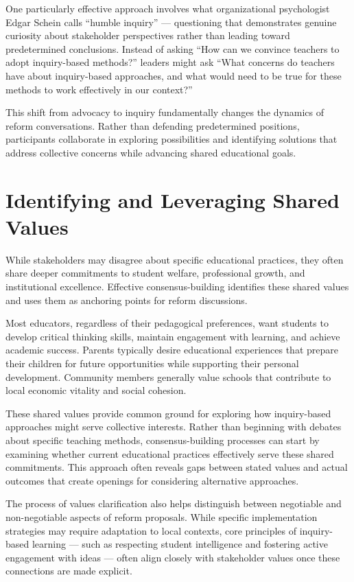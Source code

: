 \documentclass[
  Letterpaper,
]{scrbook}
\begin{document}
One particularly effective approach involves what organizational
psychologist Edgar Schein calls ``humble inquiry'' --- questioning that
demonstrates genuine curiosity about stakeholder perspectives rather
than leading toward predetermined conclusions. Instead of asking ``How
can we convince teachers to adopt inquiry-based methods?'' leaders might
ask ``What concerns do teachers have about inquiry-based approaches, and
what would need to be true for these methods to work effectively in our
context?''

This shift from advocacy to inquiry fundamentally changes the dynamics
of reform conversations. Rather than defending predetermined positions,
participants collaborate in exploring possibilities and identifying
solutions that address collective concerns while advancing shared
educational goals.

\section{Identifying and Leveraging Shared
Values}\label{identifying-and-leveraging-shared-values}

While stakeholders may disagree about specific educational practices,
they often share deeper commitments to student welfare, professional
growth, and institutional excellence. Effective consensus-building
identifies these shared values and uses them as anchoring points for
reform discussions.

Most educators, regardless of their pedagogical preferences, want
students to develop critical thinking skills, maintain engagement with
learning, and achieve academic success. Parents typically desire
educational experiences that prepare their children for future
opportunities while supporting their personal development. Community
members generally value schools that contribute to local economic
vitality and social cohesion.

These shared values provide common ground for exploring how
inquiry-based approaches might serve collective interests. Rather than
beginning with debates about specific teaching methods,
consensus-building processes can start by examining whether current
educational practices effectively serve these shared commitments. This
approach often reveals gaps between stated values and actual outcomes
that create openings for considering alternative approaches.

The process of values clarification also helps distinguish between
negotiable and non-negotiable aspects of reform proposals. While
specific implementation strategies may require adaptation to local
contexts, core principles of inquiry-based learning --- such as
respecting student intelligence and fostering active engagement with
ideas --- often align closely with stakeholder values once these
connections are made explicit.
\end{document}
